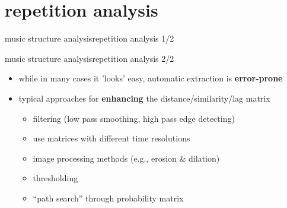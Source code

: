     \section[repetition]{repetition analysis}
        \begin{frame}{music structure analysis}{repetition analysis 1/2}
        \end{frame}
        \begin{frame}{music structure analysis}{repetition analysis 2/2}
            \begin{itemize}
                \item   while in many cases it 'looks' easy, automatic extraction is \textbf{error-prone}
                \bigskip
                \item<2->[$\Rightarrow$]   typical approaches for \textbf{enhancing} the distance/similarity/lag matrix
                    \begin{itemize}
                        \item   filtering (low pass smoothing, high pass edge detecting)
                        \item   use matrices with different time resolutions
                        \item   image processing methods (e.g., erosion \& dilation)
                        \item   thresholding
                        \item   ``path search'' through probability matrix
                    \end{itemize}
            \end{itemize}
        \end{frame}
